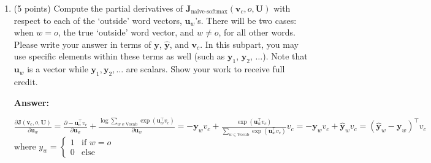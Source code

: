 \documentclass{article}
\newenvironment{answer}{
    {\bf Answer:} \sf \begingroup\color{red}
}{\endgroup}%
\begin{document}
\begin{enumerate}[label=(\alph*)]
\begin{shaded}
\begin{answer}
\begin{enumerate}[label=(\roman*)]
    \item
    Firstly, in most cases, L2 normalization does not take away useful information for the downstream task and is common practice in most downstream applications. In sentiment analysis, the sentiment of a phrase is usually determined by the relative positions of the word embeddings in the feature space rather than their magnitudes. In such cases, L2 normalization can actually improve the discriminative power of the embeddings by making them more invariant to differences in scale. \\
    However, there is a case where L2 normalization can take away useful information for the downstream task. Following the hint, consider the case where $\bm u_{x} = \alpha \bm u_{y}$ for some words $x \neq y$ and some scalar $\alpha$. In this case, L2 normalization would make the embeddings of these words indistinguishable from each other, as they would have the same direction and hence the same normalized form. This can be problematic for downstream tasks that require differentiation between words with similar directions but different magnitudes.
\end{enumerate}
\end{answer}
\end{shaded}

\item (5 points) Compute the partial derivatives of $\bm J_{\text{naive-softmax}}(\bm v_c, o, \bm U)$ with respect to each of the `outside' word vectors, $\bm u_w$'s. There will be two cases: when $w=o$, the true `outside' word vector, and $w \neq o$, for all other words. Please write your answer in terms of $\bm y$, $\hat{\bm y}$, and $\bm v_c$. In this subpart, you may use specific elements within these terms as well (such as $\bm y_1$, $\bm y_2$, $\dots$). Note that $\bm u_w$ is a vector while $\bm y_1, \bm y_2, \dots$ are scalars. Show your work to receive full credit.

\begin{shaded}
\begin{answer}
$\frac{\partial \bm J(\bm v_c, o, \bm U)}{\partial \bm u_w} 
    = \frac{\partial -\bm u_{o}^\top v_c}{\partial \bm u_w} + \frac{\log \sum_{w \in \text{Vocab}} \exp(\bm u_{w}^\top v_c)}{\partial \bm u_w} 
    = - \bm y_w v_c + \frac{\exp(\bm u_{w}^\top v_c)}{\sum_{w \in \text{Vocab}} \exp(\bm u_{w}^\top v_c)} v_c 
    = - \bm y_w v_c + \hat{\bm y}_w v_c 
    = (\hat{\bm y}_w - \bm y_w)^\top v_{c} $ \\
    where $y_w = \begin{cases}
        1 & \text{if } w = o\\
        0 & \text{else }
    \end{cases}$
\end{answer}
\end{shaded}


\end{enumerate}
\end{document}
